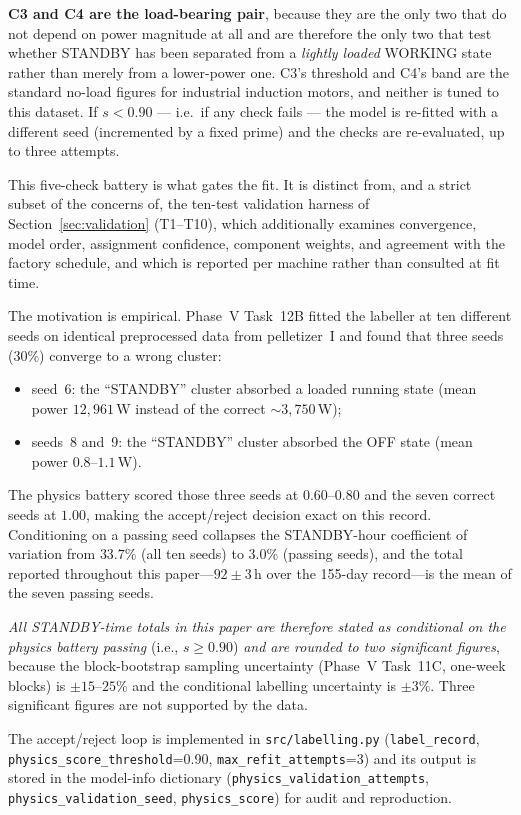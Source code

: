 \textbf{C3 and C4 are the load-bearing pair}, because they are the
only two that do not depend on power magnitude at all and are
therefore the only two that test whether STANDBY has been separated
from a \emph{lightly loaded} WORKING state rather than merely from a
lower-power one.  C3's threshold and C4's band are the standard
no-load figures for industrial induction
motors, and neither is tuned to this dataset.  If
$s < 0.90$ --- i.e.\ if any check fails --- the model is re-fitted
with a different seed (incremented by a fixed prime) and the checks
are re-evaluated, up to three attempts.

This five-check battery is what gates the fit.  It is distinct from,
and a strict subset of the concerns of, the ten-test validation
harness of Section~\ref{sec:validation} (T1--T10), which additionally
examines convergence, model order, assignment confidence, component
weights, and agreement with the factory schedule, and which is
reported per machine rather than consulted at fit time.

The motivation is empirical.  Phase~V Task~12B fitted the labeller at
ten different seeds on identical preprocessed data from pelletizer~I
and found that three seeds (30\%) converge to a wrong cluster:

\begin{itemize}
\item seed~6: the ``STANDBY'' cluster absorbed a loaded running state
  (mean power $12{,}961$\,W instead of the correct $\sim3{,}750$\,W);
\item seeds~8 and~9: the ``STANDBY'' cluster absorbed the OFF state
  (mean power $0.8$--$1.1$\,W).
\end{itemize}

The physics battery scored those three seeds at $0.60$--$0.80$ and the
seven correct seeds at $1.00$, making the accept/reject decision exact
on this record.  Conditioning on a passing seed collapses the
STANDBY-hour coefficient of variation from $33.7\%$ (all ten seeds)
to $3.0\%$ (passing seeds), and the total reported throughout this
paper---$92 \pm 3$\,h over the 155-day record---is the mean of the
seven passing seeds.

\emph{All STANDBY-time totals in this paper are therefore stated as
conditional on the physics battery passing} (i.e., $s \ge 0.90$)
\emph{and are rounded to two significant figures}, because the
block-bootstrap sampling uncertainty (Phase~V Task~11C, one-week
blocks) is $\pm 15$--$25\%$ and the conditional labelling
uncertainty is $\pm 3\%$.  Three significant figures are not
supported by the data.

The accept/reject loop is implemented in \texttt{src/labelling.py}
(\texttt{label\_record}, \texttt{physics\_score\_threshold}=0.90,
\texttt{max\_refit\_attempts}=3) and its output is stored in the
model-info dictionary (\texttt{physics\_validation\_attempts},
\texttt{physics\_validation\_seed}, \texttt{physics\_score}) for
audit and reproduction.
